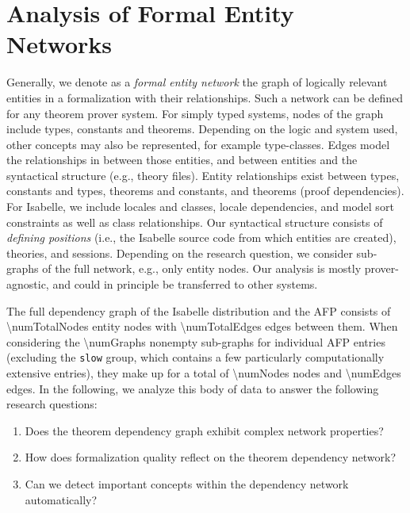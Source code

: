 \section{Analysis of Formal Entity Networks}\label{sec:network}
Generally, we denote as a \emph{formal entity network} the graph of logically relevant entities in a formalization with their relationships.
Such a network can be defined for any theorem prover system.
For simply typed systems, nodes of the graph include types, constants and theorems.
Depending on the logic and system used,
other concepts may also be represented,
for example type-classes.
Edges model the relationships in between those entities,
and between entities and the syntactical structure (e.g., theory files).
Entity relationships exist between types, constants and types, theorems and constants, and theorems (proof dependencies).
For Isabelle,
we include locales and classes, locale dependencies,
and model sort constraints as well as class relationships.
Our syntactical structure consists of \emph{defining positions}
(i.e., the Isabelle source code from which entities are created),
theories, and sessions.
Depending on the research question, we consider sub-graphs of the full network, e.g., only entity nodes.
Our analysis is mostly prover-agnostic, and could in principle be transferred to other systems.

The full dependency graph of the Isabelle distribution and the AFP consists of \SI[round-mode=places,round-precision=1]{\numTotalNodes}{\million} entity nodes with \SI[round-mode=places,round-precision=1]{\numTotalEdges}{\million} edges between them.
When considering the \num{\numGraphs} nonempty sub-graphs for individual AFP entries (excluding the \texttt{slow} group, which contains a few particularly computationally extensive entries),
they make up for a total of \SI[round-mode=places,round-precision=1]{\numNodes}{\million} nodes and \SI[round-mode=places,round-precision=1]{\numEdges}{\million} edges.
In the following, we analyze this body of data to answer the following research questions:

\begin{enumerate}[label=\bfseries{RQ\arabic*}:, leftmargin=*]
\item Does the theorem dependency graph exhibit complex network properties?
\item How does formalization quality reflect on the theorem dependency network?
\item Can we detect important concepts within the dependency network automatically?
\end{enumerate}



